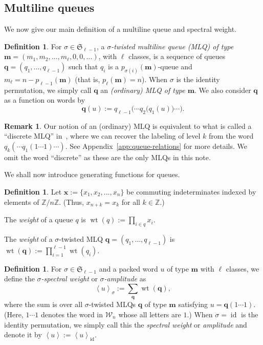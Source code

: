 \documentclass[reqno]{amsart}
\newcommand{\0}{\phantom{c}}
\newcommand{\swt}[1]{\left\langle #1 \right\rangle} %
\newcommand{\SymGp}[1]{\mathfrak{S}_{#1}} %
\DeclareMathOperator{\wt}{wt} %
\DeclareMathOperator{\id}{id} %
\newcommand{\xx}{\mathbf{x}}
\newcommand{\mm}{\mathbf{m}}
\newcommand{\qq}{\mathbf{q}}
\newcommand{\mcW}{\mathcal{W}}
\newcommand{\ZZ}{\mathbb{Z}}
\let\sumnonlimits\sum
\let\prodnonlimits\prod
\renewcommand{\sum}{\sumnonlimits\limits}
\renewcommand{\prod}{\prodnonlimits\limits}
\newcommand{\tup}[1]{\left( #1 \right)}
\newcommand{\defn}[1]{{\color{darkred}\emph{#1}}} %
\theoremstyle{plain}
\theoremstyle{definition}
\newtheorem{dfn}[thm]{Definition}
\newtheorem{remark}[thm]{Remark}
\numberwithin{equation}{section}
\begin{document}
\subsection{Multiline queues}

We now give our main definition of a multiline queue and spectral weight.

\begin{dfn}
For $\sigma \in \SymGp{\ell-1}$, a \defn{$\sigma$-twisted multiline queue (MLQ) of type $\mm = \tup{m_1, m_2, \ldots, m_\ell, 0, 0, \ldots}$}, with $\ell$ classes, is a sequence of queues $\qq = (q_1, \dotsc, q_{\ell-1})$ such that $q_i$ is a $p_{\sigma(i)}(\mm)$-queue and $m_{\ell} = n - p_{\ell-1}(\mm)$ (that is, $p_\ell(\mm) = n$).
When $\sigma$ is the identity permutation, we simply call $\qq$ an \defn{(ordinary) MLQ of type $\mm$}.
We also consider $\qq$ as a function on words by
\[
\qq(u) := q_{\ell-1}\bigl( \cdots q_2\bigl( q_1(u) \bigr) \cdots \bigr).
\]
\end{dfn}

\begin{remark}
Our notion of an (ordinary) MLQ is equivalent to what is called a ``discrete MLQ'' in~\cite[\S 2.2]{AasLin17}, where we can recover the labeling of level $k$ from the word $q_k( \cdots q_1(1 \dotsm 1) \cdots )$.
See Appendix~\ref{app:queue-relations} for more details.
We omit the word ``discrete'' as these are the only MLQs in this note.
\end{remark}

We shall now introduce generating functions for queues.

\begin{dfn}
Let $\xx := \{x_1, x_2, \ldots, x_n\}$ be commuting indeterminates indexed by elements of $\ZZ / n \ZZ$. (Thus, $x_{n+k} = x_k$ for all $k \in \ZZ$.)

The \defn{weight} of a queue $q$ is $\wt(q) := \prod_{i \in q} x_i$.

The \defn{weight} of a $\sigma$-twisted MLQ $\qq = (q_1, \dotsc, q_{\ell-1})$ is $\wt(\qq) := \prod_{i=1}^{\ell-1} \wt(q_i)$.
\end{dfn}

\begin{dfn}
For $\sigma \in \SymGp{\ell-1}$ and a packed word $u$ of type $\mm$ with $\ell$ classes, we define the \defn{$\sigma$-spectral weight} or \defn{$\sigma$-amplitude} as
\begin{equation}
\label{eq:amplitude}
  \swt{u}_{\sigma} := \sum_{\qq} \wt(\qq),
\end{equation}
where the sum is over all $\sigma$-twisted MLQs $\qq$ of type $\mm$ satisfying $u = \qq(1 \dotsm 1)$.
(Here, $1 \dotsm 1$ denotes the word in $\mcW_n$ whose all letters are $1$.)
When $\sigma = \id$ is the identity permutation, we simply call this the \defn{spectral weight} or \defn{amplitude} and denote it by $\swt{u} := \swt{u}_{\id}$.
\end{dfn}
\end{document}

